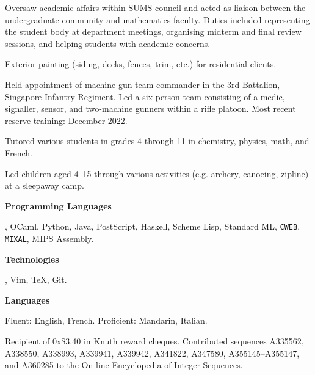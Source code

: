 \smallskip
Oversaw academic affairs within {\mc SUMS} council and acted as liaison between the undergraduate community and
mathematics faculty. Duties included representing the student body at department meetings,
organising midterm and final review sessions,
and helping students with
academic concerns.
\medbreak

\smallskip
Exterior painting (siding, decks, fences, trim, etc.) for residential clients.
\medbreak

\smallskip
Held appointment of machine-gun team commander in the 3rd Battalion, Singapore Infantry Regiment.
Led a six-person team consisting of a medic, signaller, sensor, and two-machine gunners within a rifle platoon.
Most recent reserve training: December 2022.
\medbreak

\smallskip
Tutored various students in grades 4 through 11 in chemistry, physics, math, and French.
\medbreak

\smallskip
Led children aged 4--15 through various activities (e.g. archery, canoeing, zipline) at a sleepaway camp.
\medbreak


{\bf Programming Languages}\par
\CEE, OCaml, Python, Java, PostScript, Haskell, Scheme Lisp,  Standard ML, {\tt CWEB}, {\tt MIXAL},
{\mc MIPS} Assembly.
\medbreak

{\bf Technologies}\par
\UNIX, Vim, \TeX, Git.
\medbreak

{\bf Languages}\par
Fluent: English, French. Proficient: Mandarin, Italian.
\medbreak


\parindent=10pt
\thing Recipient of 0x\$3.40 in Knuth reward cheques.
\smallskip
\thing Contributed sequences A335562, A338550, A338993, A339941, A339942, A341822, A347580,
A355145--A355147, and A360285
to the On-line Encyclopedia of Integer Sequences.
\medbreak

\filbreak

\bye

